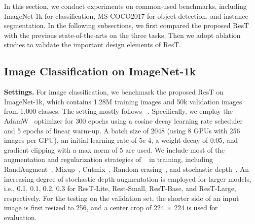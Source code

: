 \documentclass{article}
\begin{document}
In this section, we conduct experiments on common-used benchmarks, including ImageNet-1k for classification, MS COCO2017 for object detection, and instance segmentation. In the following subsections, we first compared the proposed ResT with the previous state-of-the-arts on the three tasks. Then we adopt ablation studies to validate the important design elements of ResT.

\subsection{Image Classification on ImageNet-1k}
\textbf{Settings.} For image classification, we benchmark the proposed ResT on ImageNet-1k, which contains 1.28M training images and 50k validation images from 1,000 classes. The setting mostly follows ~\cite{DBLP:journals/corr/abs-2012-12877}. Specifically, we employ the AdamW~\cite{DBLP:conf/iclr/LoshchilovH19} optimizer
for 300 epochs using a cosine decay learning rate scheduler and 5 epochs of linear warm-up. A batch size of 2048 (using 8 GPUs with 256 images per GPU), an initial learning rate of 5e-4, a weight decay of 0.05, and gradient clipping with a max norm of 5 are used. We include most of the augmentation and regularization strategies of ~\cite{DBLP:journals/corr/abs-2012-12877} in training, including RandAugment~\cite{DBLP:conf/nips/CubukZS020}, Mixup~\cite{DBLP:conf/iclr/ZhangCDL18}, Cutmix~\cite{DBLP:conf/iccv/YunHCOYC19}, Random erasing~\cite{DBLP:conf/aaai/Zhong0KL020}, and stochastic depth~\cite{DBLP:conf/eccv/HuangSLSW16}. An increasing degree of stochastic depth augmentation is employed for larger models, i.e., 0.1, 0.1, 0.2, 0.3 for ResT-Lite, Rest-Small, ResT-Base, and ResT-Large, respectively. For the testing on the validation set, the shorter side of an input image is first resized to 256, and a center crop of 224 × 224 is used for evaluation.
\end{document}
